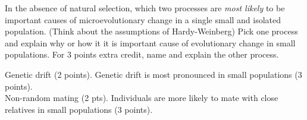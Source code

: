 \question[5]
In the absence of natural selection, which two processes are \emph{most likely} to be important causes of microevolutionary change in a single small and isolated population. (Think about the assumptions of Hardy-Weinberg) Pick one process and explain why or how it it is important cause of evolutionary change in small populations. For 3 points extra credit, name and explain the other process.


\begin{solution}
Genetic drift (2 points). Genetic drift is most pronounced in small populations (3 points). \\
Non-random mating (2 pts).  Individuals are more likely to mate with close relatives in small populations (3 points).
\end{solution}
